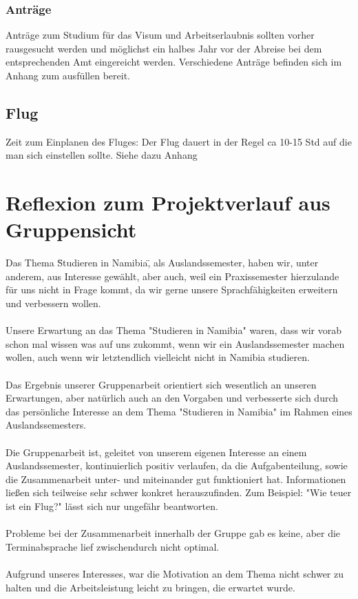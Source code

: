\documentclass[11pt]{article}
\begin{document}
\subsubsection{Anträge}
Anträge zum Studium für das Visum und Arbeitserlaubnis sollten vorher rausgesucht werden und möglichst ein halbes Jahr vor der Abreise bei dem entsprechenden Amt eingereicht werden. Verschiedene Anträge befinden sich im Anhang zum ausfüllen bereit.

\subsection{Flug}
Zeit zum Einplanen des Fluges: Der Flug dauert in der Regel ca 10-15 Std auf die man sich einstellen sollte.
Siehe dazu Anhang

\section{Reflexion zum Projektverlauf aus Gruppensicht}
Das Thema \"Studieren in Namibia\", als Auslandssemester, haben wir, unter anderem, 
aus Interesse gewählt, aber auch, weil ein Praxissemester hierzulande für uns nicht 
in Frage kommt, da wir gerne unsere Sprachfähigkeiten erweitern und verbessern wollen.
\\\\
Unsere Erwartung an das Thema "Studieren in Namibia" waren, dass wir vorab schon mal
wissen was auf uns zukommt, wenn wir ein Auslandssemester machen wollen, auch
wenn wir letztendlich vielleicht nicht in Namibia studieren.
\\\\
Das Ergebnis unserer Gruppenarbeit orientiert sich wesentlich an unseren Erwartungen,
aber natürlich auch an den Vorgaben und verbesserte sich durch das persönliche Interesse
an dem Thema "Studieren in Namibia" im Rahmen eines Auslandssemesters.
\\\\
Die Gruppenarbeit ist, geleitet von unserem eigenen Interesse an einem Auslandssemester,
kontinuierlich positiv verlaufen, da die Aufgabenteilung, sowie die Zusammenarbeit
unter- und miteinander gut funktioniert hat.
Informationen ließen sich teilweise sehr schwer konkret herauszufinden.
Zum Beispiel: "Wie teuer ist ein Flug?" lässt sich nur ungefähr beantworten.
\\\\
Probleme bei der Zusammenarbeit innerhalb der Gruppe gab es keine, aber die 
Terminabsprache lief zwischendurch nicht optimal.
\\\\
Aufgrund unseres Interesses, war die Motivation an dem Thema nicht schwer zu halten
und die Arbeitsleistung leicht zu bringen, die erwartet wurde.
\\\\
\end{document}
